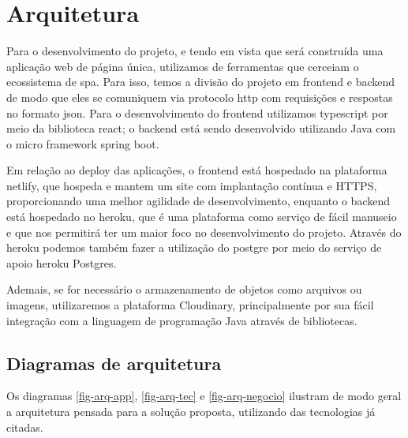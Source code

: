 \section{Arquitetura}
Para o desenvolvimento do projeto, e tendo em vista que será construída uma aplicação web de página única, utilizamos de ferramentas que cerceiam o ecossistema de \ac{spa}. Para isso, temos a divisão do projeto em \gls{frontend} e \gls{backend} de modo que eles se comuniquem via protocolo \ac{http} com requisições e respostas no formato \ac{json}. Para o desenvolvimento do \gls{frontend} utilizamos \gls{typescript} por meio da biblioteca \gls{react}; o \gls{backend} está sendo desenvolvido utilizando Java com o micro \gls{framework} \gls{spring boot}. %

Em relação ao \gls{deploy} das aplicações, o \gls{frontend} está hospedado na plataforma \gls{netlify}, que hospeda e mantem um site com implantação contínua e HTTPS, proporcionando uma melhor agilidade de desenvolvimento, enquanto o \gls{backend} está hospedado no \gls{heroku}, que é uma plataforma como serviço de fácil manuseio e que nos permitirá ter um maior foco no desenvolvimento do projeto. Através do \gls{heroku} podemos também fazer a utilização do \gls{postgre} por meio do serviço de apoio \gls{heroku} Postgres.

Ademais, se for necessário o armazenamento de objetos como arquivos ou imagens, utilizaremos a plataforma Cloudinary, principalmente por sua fácil integração com a linguagem de programação Java através de bibliotecas.

\subsection{Diagramas de arquitetura}
Os diagramas \autoref{fig-arq-app}, \autoref{fig-arq-tec} e \autoref{fig-arq-negocio} ilustram de modo geral a arquitetura pensada para a solução proposta, utilizando das tecnologias já citadas.

